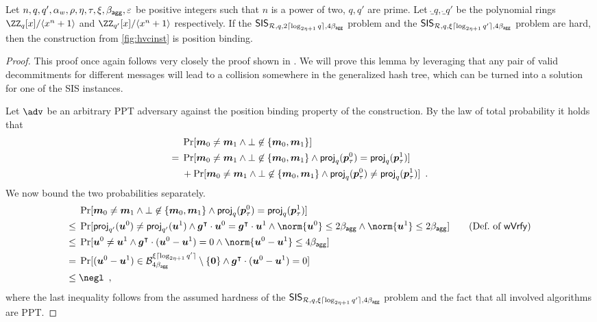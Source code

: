 \begin{lemma}\label{lem:hvcposbind}
  Let $n,q,q',\alpha_w,\rho,\eta,\tau,\xi,\beta_{\mathsf{agg}},\varepsilon$ be positive integers such that $n$ is a power of two, $q,q'$ are prime.
  Let $\ring_q,\ring_{q'}$ be the polynomial rings $\ZZ_q[x]/\langle x^n+1\rangle$ and $\ZZ_{q'}[x]/\langle x^n+1\rangle$ respectively.
  If the $\mathsf{SIS}_{\mathcal{R},q,2\lceil \log_{2\eta+1} q \rceil,4\beta_{\mathsf{agg}}}$ problem and the $\mathsf{SIS}_{\mathcal{R},q,\xi\lceil \log_{2\eta+1} q' \rceil,4\beta_{\mathsf{agg}}}$ problem are hard, then the construction from \autoref{fig:hvcinst} is position binding.
\end{lemma}
\begin{proof}
This proof once again follows very closely the proof shown in \cite{CCS:FleSimZha22}.
We will prove this lemma by leveraging that any pair of valid decommitments for different messages will lead to a collision somewhere in the generalized hash tree, which can be turned into a solution for one of the SIS instances. 

  Let $\adv$ be an arbitrary PPT adversary against the position binding property of the construction.
%  
  By the law of total probability it holds that
  \begin{align*}
    &\Pr[\boldsymbol{m}_0\neq \boldsymbol{m}_1 \land \bot\not\in\{\boldsymbol{m}_0,\boldsymbol{m}_1\}]\\
    ={}& \Pr[\boldsymbol{m}_0\neq \boldsymbol{m}_1 \land \bot\not\in\{\boldsymbol{m}_0,\boldsymbol{m}_1\} \land \mathsf{proj}_{q}(\boldsymbol{p}_\tau^0) = \mathsf{proj}_{q}(\boldsymbol{p}_\tau^1)]\\& 
    +
    \Pr[\boldsymbol{m}_0\neq \boldsymbol{m}_1 \land \bot\not\in\{\boldsymbol{m}_0,\boldsymbol{m}_1\} \land \mathsf{proj}_{q}(\boldsymbol{p}_\tau^0) \neq \mathsf{proj}_{q}(\boldsymbol{p}_\tau^1)]\enspace.
  \end{align*}
%
  We now bound the two probabilities separately.
%  
  \begin{align*}
    &\Pr[\vec{m}_0\neq \vec{m}_1 \land \bot\not\in\{\vec{m}_0,\vec{m}_1\} \land \projmod{q}(\vec{p}_\tau^0) = \projmod{q}(\vec{p}_\tau^1)]\\
    \leq{}&\Pr[\projmod{q'}(\vec{u}^0) \neq \projmod{q'}(\vec{u}^1) \land \vec{g}^\transpose\cdot \vec{u}^0 = \vec{g}^\transpose\cdot \vec{u}^1 \land \norm{\vec{u}^0}\leq 2\bagg \land \norm{\vec{u}^1}\leq 2\bagg]\tag{Def.\ of $\wverify$}\\
    \leq{}& \Pr[\vec{u}^0 \neq \vec{u}^1 \land \vec{g}^\transpose\cdot (\vec{u}^0-\vec{u}^1) = 0 \land \norm{\vec{u}^0-\vec{u}^1}\leq 4\bagg]\\
    = {}& \Pr[(\vec{u}^0-\vec{u}^1) \in \ball_{4\bagg}^{\xi\lceil\log_{2\eta+1}q'\rceil}\setminus \{\vec{0}\} \land \vec{g}^\transpose\cdot (\vec{u}^0-\vec{u}^1) = 0]\\
    \leq{}& \negl\enspace,
  \end{align*}
  where the last inequality follows from the assumed hardness of the $\mathsf{SIS}_{\mathcal{R},q,\xi\lceil \log_{2\eta+1} q'\rceil,4\beta_{\mathsf{agg}}}$ problem and the fact that all involved algorithms are PPT.
  

\end{proof}
